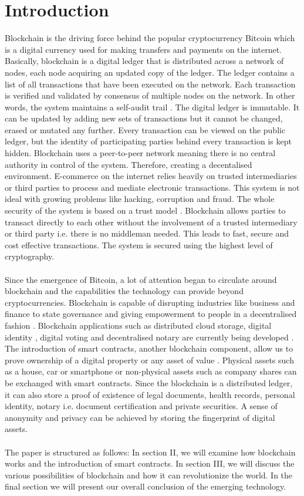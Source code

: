 \documentclass[report]{IEEEtran}
\begin{document}
\section{Introduction}
Blockchain is the driving force behind the popular cryptocurrency Bitcoin which is a digital currency used for making transfers and payments on the internet. Basically, blockchain is a digital ledger that is distributed across a network of nodes, each node acquiring an updated copy of the ledger. The ledger contains a list of all transactions that have been executed on the network. Each transaction is verified and validated by consensus of multiple nodes on the network. In other words, the system maintains a self-audit trail \cite{finance}. The digital ledger is immutable. It can be updated by adding new sets of transactions but it cannot be changed, erased or mutated any further. Every transaction can be viewed on the public ledger, but the identity of participating parties behind every transaction is kept hidden. Blockchain uses a peer-to-peer network \cite{Bitcoin08} meaning there is no central authority in control of the system. Therefore, creating a decentalised environment. E-commerce on the internet relies heavily on trusted intermediaries or third parties to process and mediate electronic transactions. This system is not ideal with growing problems like hacking, corruption and fraud. The whole security of the system is based on a trust model \cite{Carstens21}. Blockchain allows parties to transact directly to each other without the involvement of a trusted intermediary or third party i.e. there is no middleman needed. This leads to fast, secure and cost effective transactions. The system is secured using the highest level of cryptography.
\\\\ Since the emergence of Bitcoin, a lot of attention began to circulate around blockchain and the capabilities the technology can provide beyond cryptocurrencies. Blockchain is capable of disrupting industries like business and finance to state governance and giving empowerment to people in a decentralised fashion \cite{BaurDimpfl20}. Blockchain applications such as distributed cloud storage, digital identity \cite{Poskart20}, digital voting and decentralised notary are currently being developed \cite{air}. The introduction of smart contracts, another blockchain component, allow us to prove ownership of a digital property or any asset of value \cite{smartcon}. Physical assets such as a house, car or smartphone or non-physical assets such as company shares can be exchanged with smart contracts. Since the blockchain is a distributed ledger, it can also store a proof of existence of legal documents, health records, personal identity, notary i.e. document certification and private securities. A sense of anonymity and privacy can be achieved by storing the fingerprint of digital assets. 
\\\\ The paper is structured as follows: In section II, we will examine how blockchain works and the introduction of smart contracts. In section III, we will discuss the various possibilities of blockchain and how it can revolutionize the world. In the final section we will present our overall conclusion of the emerging technology.
\end{document}
